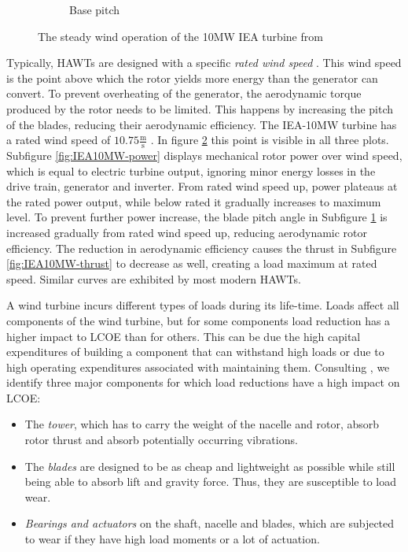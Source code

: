 \begin{figure}
\begin{subfigure}[b]{0.32\textwidth}
    \caption{Base pitch}
    \label{fig:IEA10MW-pitch}
  \end{subfigure}
  \caption{The steady wind operation of the 10MW IEA turbine from \citet[Figure 33]{bortolottiIEAWindTCP2019}}
  \label{fig:IEA10MW}
\end{figure}

Typically, \acp{HAWT} are designed with a specific \textit{rated wind speed} \cite[Chapter 6.3]{burtonWindEnergyHandbook2011}. This wind speed is the point above which the rotor yields more energy than the generator can convert. To prevent overheating of the generator, the aerodynamic torque produced by the rotor needs to be limited. This happens by increasing the pitch of the blades, reducing their aerodynamic efficiency. The IEA-10MW turbine has a rated wind speed of $10.75 \frac{\text{m}}{\text{s}}$ \cite[Table 16]{bortolottiIEAWindTCP2019}. In figure \ref{fig:IEA10MW} this point is visible in all three plots. Subfigure \ref{fig:IEA10MW-power} displays mechanical rotor power over wind speed, which is equal to electric turbine output, ignoring minor energy losses in the drive train, generator and inverter. From rated wind speed up, power plateaus at the rated power output, while below rated it gradually increases to maximum level. To prevent further power increase, the blade pitch angle in Subfigure \ref{fig:IEA10MW-pitch} is increased gradually from rated wind speed up, reducing aerodynamic rotor efficiency. The reduction in aerodynamic efficiency causes the thrust in Subfigure \ref{fig:IEA10MW-thrust} to decrease as well, creating a load maximum at rated speed. Similar curves are exhibited by most modern \acp{HAWT}.

A wind turbine incurs different types of loads during its life-time. Loads affect all components of the wind turbine, but for some components load reduction has a higher impact to \ac{LCOE} than for others. This can be due the high capital expenditures of building a component that can withstand high loads or due to high operating expenditures associated with maintaining them. Consulting \citet{stehly2019CostWind2020}, we identify three major components for which load reductions have a high impact on \ac{LCOE}:

\begin{itemize}
  \item The \textit{tower}, which has to carry the weight of the nacelle and rotor, absorb rotor thrust and absorb potentially occurring vibrations.
  \item The \textit{blades} are designed to be as cheap and lightweight as possible while still being able to absorb lift and gravity force. Thus, they are susceptible to load wear.
  \item \textit{Bearings and actuators} on the shaft, nacelle and blades, which are subjected to wear if they have high load moments or a lot of actuation.
\end{itemize}

